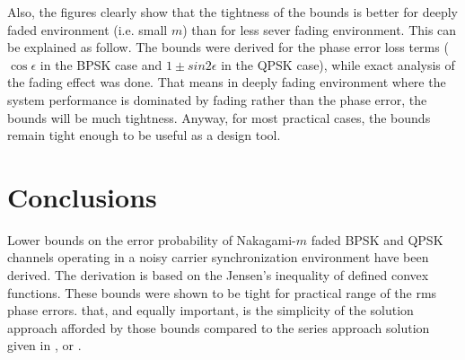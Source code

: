 Also, the figures clearly show that the tightness of the bounds is
better for deeply faded environment (i.e. small $m$) than for less
sever fading environment. This can be explained as follow. The
bounds were derived for the phase error loss terms (
$\cos\epsilon$ in the BPSK case and $1\pm sin2\epsilon$  in the
QPSK case), while exact analysis of the fading effect was done.
That means in deeply fading environment where the system
performance is dominated by fading rather than the phase error,
the bounds will be much tightness. Anyway, for most practical
cases, the bounds remain tight enough to be useful as a design
tool.
\section{Conclusions}
Lower bounds on the error probability of Nakagami-$m$ faded BPSK
and QPSK channels operating in a noisy carrier synchronization
environment have been derived. The derivation is based on the
Jensen's inequality of defined convex functions. These bounds were
shown to be tight for practical range of the rms phase errors.
that, and equally important, is the simplicity of the solution
approach afforded by those bounds compared to the series approach
solution given in \cite{smadi:TBParticle01}, or
\cite{simon:mar01}.
